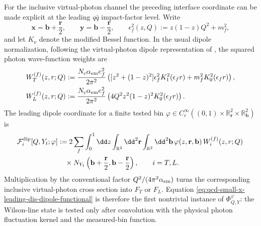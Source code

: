 \begin{controlledapproximation}
\label{ca:qcd-small-x-leading-dis-dipole-channel}
For the inclusive virtual-photon channel the preceding interface coordinate can
be made explicit at the leading \(q\bar q\) impact-factor level.  Write
\[
  \mathbf x=\mathbf b+\frac{\mathbf r}{2},
  \qquad
  \mathbf y=\mathbf b-\frac{\mathbf r}{2},
  \qquad
  \epsilon_f^2(z,Q):=z(1-z)Q^2+m_f^2 ,
\]
and let \(K_\nu\) denote the modified Bessel function.  In the usual dipole
normalization, following the virtual-photon dipole representation of
\cite{NikolaevZakharov1991,Kovchegov1999SmallXF2}, the squared photon
wave-function weights are
\begin{align}
  W_T^{(f)}(z,r;Q)
  &:=
  \frac{N_c\alpha_{\rm em}e_f^2}{2\pi^2}
  \left(
    [z^2+(1-z)^2]\epsilon_f^2 K_1^2(\epsilon_f r)
    +m_f^2K_0^2(\epsilon_f r)
  \right),
  \label{eq:qcd-small-x-photon-wavefunction-transverse}
\\
  W_L^{(f)}(z,r;Q)
  &:=
  \frac{N_c\alpha_{\rm em}e_f^2}{2\pi^2}
  \left(
    4Q^2z^2(1-z)^2K_0^2(\epsilon_f r)
  \right).
  \label{eq:qcd-small-x-photon-wavefunction-longitudinal}
\end{align}
The leading dipole coordinate for a finite tested bin
\(\varphi\in C_c^\infty((0,1)\times\mathbb R^2_{\mathbf r}
\times\mathbb R^2_{\mathbf b})\) is
\begin{align}
  \mathcal F_i^{\rm dip}[Q,Y_t;\varphi]
  &:=
  2\sum_f
  \int_0^1\dd z
  \int_{\mathbb R^2}\dd^2\mathbf r
  \int_{\mathbb R^2}\dd^2\mathbf b\,
  \varphi(z,\mathbf r,\mathbf b)\,
  W_i^{(f)}(z,r;Q)\,
  \notag
\\
  &\quad{}\times
  N_{Y_t}
  \left(
    \mathbf b+\frac{\mathbf r}{2},
    \mathbf b-\frac{\mathbf r}{2}
  \right),
  \qquad i=T,L .
  \label{eq:qcd-small-x-leading-dis-dipole-functional}
\end{align}
Multiplication by the conventional factor \(Q^2/(4\pi^2\alpha_{\rm em})\)
turns the corresponding inclusive virtual-photon cross section into
\(F_T\) or \(F_L\).  Equation
\eqref{eq:qcd-small-x-leading-dis-dipole-functional} is therefore the first
nontrivial instance of \(\Phi^\varphi_{Q,Y}\): the Wilson-line state is
tested only after convolution with the physical photon fluctuation kernel and
the measured-bin function.


\end{controlledapproximation}
